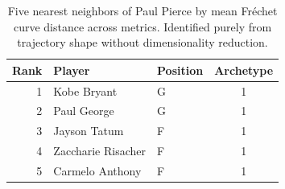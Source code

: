 \begin{table}[htbp]
  \centering\small
  \begin{tabular}{rllc}
    \toprule
    Rank & Player & Position & Archetype \\
    \midrule
    1 & Kobe Bryant & G & 1 \\
    2 & Paul George & G & 1 \\
    3 & Jayson Tatum & F & 1 \\
    4 & Zaccharie Risacher & F & 1 \\
    5 & Carmelo Anthony & F & 1 \\
    \bottomrule
  \end{tabular}
  \caption{Five nearest neighbors of Paul Pierce by mean Fr\'{e}chet curve distance across metrics. Identified purely from trajectory shape without dimensionality reduction.}
  \label{tab:Paul_Pierce_frechet_curve_neighbors}
\end{table}

